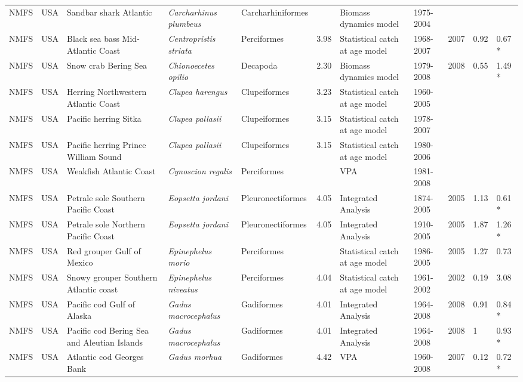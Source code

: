 \begin{longtable}{p{1.5cm}p{1.5cm}p{3cm}p{3cm}p{2.5cm}p{0.9cm}p{1.4cm}p{0.9cm}p{0.9cm}p{0.9cm}p{1cm}}
  NMFS & USA & Sandbar shark Atlantic & \textit{Carcharhinus plumbeus} & Carcharhiniformes &  & Biomass dynamics model & 1975-2004 &  &  &  \\ 
  NMFS & USA & Black sea bass Mid-Atlantic Coast & \textit{Centropristis striata} & Perciformes & 3.98 & Statistical catch at age model & 1968-2007 & 2007 & 0.92 & 0.67 * \\ 
  NMFS & USA & Snow crab Bering Sea & \textit{Chionoecetes opilio} & Decapoda & 2.30 & Biomass dynamics model & 1979-2008 & 2008 & 0.55 & 1.49 * \\ 
  NMFS & USA & Herring Northwestern Atlantic Coast & \textit{Clupea harengus} & Clupeiformes & 3.23 & Statistical catch at age model & 1960-2005 &  &  &  \\ 
  NMFS & USA & Pacific herring Sitka & \textit{Clupea pallasii} & Clupeiformes & 3.15 & Statistical catch at age model & 1978-2007 &  &  &  \\ 
  NMFS & USA & Pacific herring Prince William Sound & \textit{Clupea pallasii} & Clupeiformes & 3.15 & Statistical catch at age model & 1980-2006 &  &  &  \\ 
  NMFS & USA & Weakfish Atlantic Coast & \textit{Cynoscion regalis} & Perciformes &  & VPA & 1981-2008 &  &  &  \\ 
  NMFS & USA & Petrale sole Southern Pacific Coast & \textit{Eopsetta jordani} & Pleuronectiformes & 4.05 & Integrated Analysis & 1874-2005 & 2005 & 1.13 & 0.61 * \\ 
  NMFS & USA & Petrale sole Northern Pacific Coast & \textit{Eopsetta jordani} & Pleuronectiformes & 4.05 & Integrated Analysis & 1910-2005 & 2005 & 1.87 & 1.26 * \\ 
  NMFS & USA & Red grouper Gulf of Mexico & \textit{Epinephelus morio} & Perciformes &  & Statistical catch at age model & 1986-2005 & 2005 & 1.27 & 0.73 \\ 
  NMFS & USA & Snowy grouper Southern Atlantic coast & \textit{Epinephelus niveatus} & Perciformes & 4.04 & Statistical catch at age model & 1961-2002 & 2002 & 0.19 & 3.08 \\ 
  NMFS & USA & Pacific cod Gulf of Alaska & \textit{Gadus macrocephalus} & Gadiformes & 4.01 & Integrated Analysis & 1964-2008 & 2008 & 0.91 & 0.84 * \\ 
  NMFS & USA & Pacific cod Bering Sea and Aleutian Islands & \textit{Gadus macrocephalus} & Gadiformes & 4.01 & Integrated Analysis & 1964-2008 & 2008 & 1 & 0.93 * \\ 
  NMFS & USA & Atlantic cod Georges Bank & \textit{Gadus morhua} & Gadiformes & 4.42 & VPA & 1960-2008 & 2007 & 0.12 & 0.72 * \\ 

\end{longtable}
